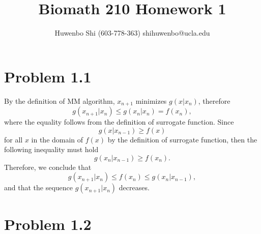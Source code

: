 \documentclass{scrartcl}
\begin{document}

\newcommand*{\TitleFont}{
      \usefont{\encodingdefault}{\rmdefault}{b}{n}
      \fontsize{16}{20}
      \selectfont}
\newcommand*{\AuthorFont}{
      \usefont{\encodingdefault}{\rmdefault}{r}{n}
      \fontsize{12}{20}
      \selectfont}
\title{\TitleFont Biomath 210 Homework 1}
\author{\AuthorFont Huwenbo Shi (603-778-363) shihuwenbo@ucla.edu}
\maketitle

\newcommand{\E}{\mathrm{E}}
\def\mb#1{\mathbf{#1}}


\section*{Problem 1.1}

By the definition of MM algorithm, $x_{n+1}$ minimizes $g(x|x_n)$, therefore
\begin{equation}
g(x_{n+1}|x_n) \le g(x_n|x_n) = f(x_n),
\end{equation}
where the equality follows from the definition of surrogate function. Since
\begin{equation}
	g(x|x_{n-1}) \ge f(x)
\end{equation}
for all $x$ in the domain of $f(x)$ by the definition of surrogate function,
then the following inequality must hold
\begin{equation}
	g(x_n|x_{n-1}) \ge f(x_n) .
\end{equation}
Therefore, we conclude that
\begin{equation}
	g(x_{n+1}|x_n) \le f(x_n) \le g(x_n|x_{n-1}) ,
\end{equation}
and that the sequence $g(x_{n+1}|x_n)$ decreases.


\section*{Problem 1.2}
\end{document}
